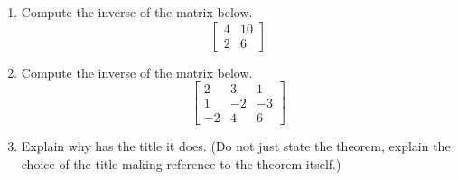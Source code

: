 \begin{enumerate}
%
\item  Compute the inverse of the matrix below.
%
\begin{equation*}
\begin{bmatrix}
4 & 10\\
2 & 6
\end{bmatrix}
\end{equation*}
%
%
\item Compute the inverse of the matrix below.
%
\begin{equation*}
\begin{bmatrix}
2 & 3 & 1\\
1 & -2 & -3\\
-2 & 4 & 6
\end{bmatrix}
\end{equation*}
%
\item  Explain why  has the title it does. (Do not just state
the theorem, explain the choice of the title making reference to the
theorem itself.)
%
\end{enumerate}